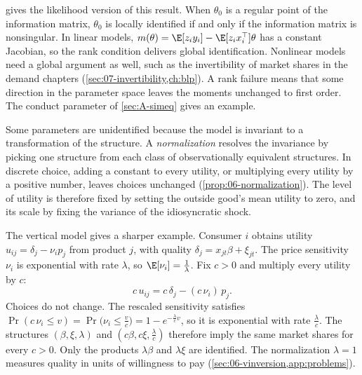 \citet{Rothenberg1971} gives the likelihood version of this result. When $\theta_0$ is a regular point of the
information matrix, $\theta_0$ is locally identified if and only if the information matrix is nonsingular.
In linear models, $m(\theta) = \E[z_i y_i] - \E[z_i x_i^\top]\theta$ has a constant Jacobian, so the rank
condition delivers global identification. Nonlinear models need a global argument as well, such as the
invertibility of market shares in the demand chapters (\cref{sec:07-invertibility,ch:blp}). A rank failure
means that some direction in the parameter space leaves the moments unchanged to first order. The conduct parameter of
\cref{sec:A-simeq} gives an example.

Some parameters are unidentified because the model is invariant to a transformation of the structure. A
\emph{normalization} resolves the invariance by picking one structure from each class of observationally
equivalent structures. In discrete choice, adding a constant to every utility, or multiplying every utility
by a positive number, leaves choices unchanged (\cref{prop:06-normalization}). The level of utility is
therefore fixed by setting the outside good's mean utility to zero, and its scale by fixing the variance of
the idiosyncratic shock.

The vertical model gives a sharper example. Consumer $i$ obtains utility $u_{ij} = \delta_j - \nu_i p_j$
from product $j$, with quality $\delta_j = x_{jt}\beta + \xi_{jt}$. The price sensitivity $\nu_i$ is
exponential with rate $\lambda$, so $\E[\nu_i] = \frac{1}{\lambda}$. Fix $c > 0$ and multiply every utility
by $c$:
\begin{equation*}
c\,u_{ij} = c\,\delta_j - (c\,\nu_i)\,p_j .
\end{equation*}
Choices do not change. The rescaled sensitivity satisfies
$\Pr(c\,\nu_i \le v) = \Pr\bigl(\nu_i \le \frac{v}{c}\bigr) = 1 - e^{-\frac{\lambda}{c}v}$, so it is
exponential with rate $\frac{\lambda}{c}$. The structures $(\beta, \xi, \lambda)$ and
$(c\beta, c\xi, \frac{\lambda}{c})$ therefore imply the same market shares for every $c > 0$. Only the
products $\lambda\beta$ and $\lambda\xi$ are identified. The normalization $\lambda = 1$ measures quality in
units of willingness to pay (\cref{sec:06-vinversion,app:problems}).

